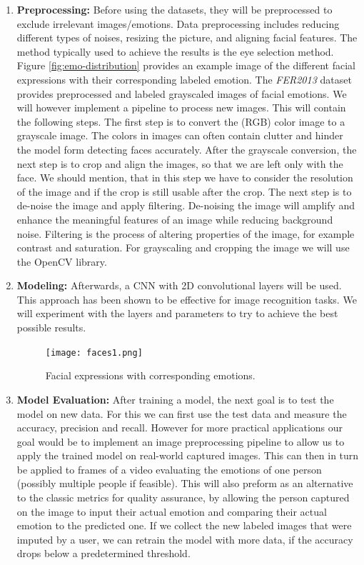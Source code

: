 \begin{enumerate}
\item \textbf{Preprocessing:}
Before using the datasets, they will be preprocessed to exclude irrelevant images/emotions. Data preprocessing includes reducing different types of noises, resizing the picture, and aligning facial features. The method typically used to achieve the results is the eye selection method. Figure \ref{fig:emo-distribution} provides an example image of the different facial expressions with their corresponding labeled emotion. 
The \textit{FER2013} dataset provides preprocessed and labeled grayscaled images of facial emotions. We will however implement a pipeline to process new images. This will contain the following steps. The first step is to convert the (RGB) color image to a grayscale image. The colors in images can often contain clutter and hinder the model form detecting faces accurately. After the grayscale conversion, the next step is to crop and align the images, so that we are left only with the face. We should mention, that in this step we have to consider the resolution of the image and if the crop is still usable after the crop. The next step is to de-noise the image and apply filtering. De-noising the image will amplify and enhance the meaningful features of an image while reducing background noise.   Filtering is the process of altering properties of the image, for example contrast and saturation. For grayscaling and cropping the image we will use the OpenCV library.

\item \textbf{Modeling:}
Afterwards, a CNN with 2D convolutional layers will be used. This approach has been shown to be effective for image recognition tasks. We will experiment with the layers and parameters to try to achieve the best possible results. 

\begin{figure}[h]
\centering
\texttt{[image: faces1.png]}\\
\caption{Facial expressions with corresponding emotions. \cite{FER2013}}\label{fig:faces}
\end{figure}

\newpage
\item \textbf{Model Evaluation:}
After training a model, the next goal is to test the model on new data. For this we can first use the test data and measure the accuracy, precision and recall. However for more practical applications our goal would be to implement an image preprocessing pipeline to allow us to apply the trained model on real-world captured images. This can then in turn be applied to frames of a video evaluating the emotions of one person (possibly multiple people if feasible). This will also preform as an alternative to the classic metrics for quality assurance, by allowing the person captured on the image to input their actual emotion and comparing their actual emotion to the predicted one. If we collect the new labeled images that were imputed by a user, we can retrain the model with more data, if the accuracy drops below a predetermined threshold.


\end{enumerate}
